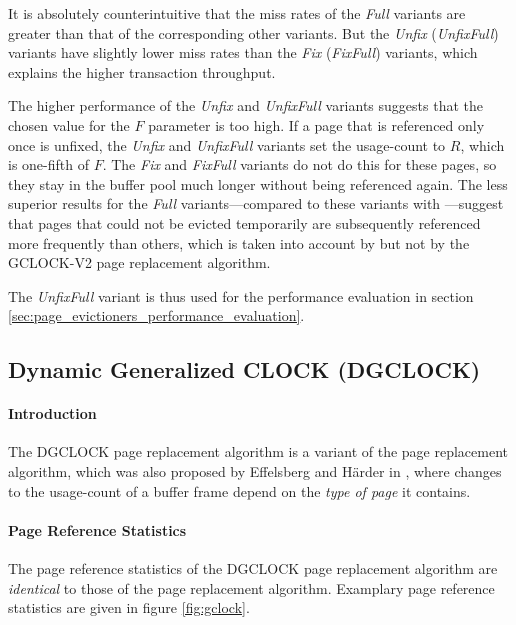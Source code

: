     It is absolutely counterintuitive that the miss rates of the \emph{Full} variants are greater than that of the corresponding other variants. But the \emph{Unfix} (\emph{UnfixFull}) variants have slightly lower miss rates than the \emph{Fix} (\emph{FixFull}) variants, which explains the higher transaction throughput.

    The higher performance of the \emph{Unfix} and \emph{UnfixFull} variants suggests that the chosen value for the $F$ parameter is too high. If a page that is referenced only once is unfixed, the \emph{Unfix} and \emph{UnfixFull} variants set the usage-count to $R$, which is one-fifth of $F$. The \emph{Fix} and \emph{FixFull} variants do not do this for these pages, so they stay in the buffer pool much longer without being referenced again. The less superior results for the \emph{Full} variants---compared to these variants with ---suggest that pages that could not be evicted temporarily are subsequently referenced more frequently than others, which is taken into account by  but not by the GCLOCK-V2 page replacement algorithm.

    The \emph{UnfixFull} variant is thus used for the performance evaluation in section \ref{sec:page_evictioners_performance_evaluation}.

\subsection[DGCLOCK]{Dynamic Generalized CLOCK (DGCLOCK)} \label{subsec:dgclock}

\paragraph{Introduction}

    The DGCLOCK page replacement algorithm is a variant of the  page replacement algorithm, which was also proposed by Effelsberg and Härder in \cite{Effelsberg:1984}, where changes to the usage-count of a buffer frame depend on the \emph{type of page} it contains.

\paragraph{Page Reference Statistics}

    The page reference statistics of the DGCLOCK page replacement algorithm are \emph{identical} to those of the  page replacement algorithm. Examplary page reference statistics are given in figure \ref{fig:gclock}. 

